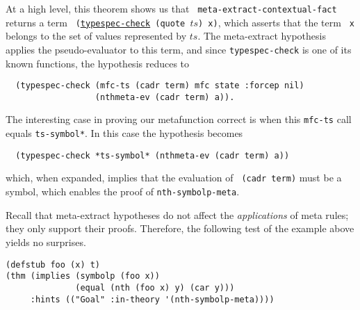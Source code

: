 \noindent At a high level, this theorem shows us that {\tt
  meta-extract-contextual-fact} returns a term {\tt
  (\href{http://www.cs.utexas.edu/users/moore/acl2/manuals/current/manual/index.html?topic=ACL2\_\_\_\_TYPESPEC-CHECK}{\underline{typespec-check}} (quote $ts$) x)}, which asserts that the term {\tt
  x} belongs to the set of values represented by $ts$.  The
meta-extract hypothesis applies the pseudo-evaluator to this term, and
since {\tt typespec-\allowbreak{}check} is one of its known functions, the
hypothesis reduces to
\begin{verbatim}
  (typespec-check (mfc-ts (cadr term) mfc state :forcep nil)
                  (nthmeta-ev (cadr term) a)).
\end{verbatim}
\noindent The interesting case in proving our metafunction correct is
when this {\tt mfc-ts} call equals {\tt *ts-symbol*}.  In this case the hypothesis becomes
\begin{verbatim}
  (typespec-check *ts-symbol* (nthmeta-ev (cadr term) a))
\end{verbatim}
\noindent which, when expanded, implies that the evaluation of {\tt
  (cadr term)} must be a
symbol, which enables the proof of {\tt nth-symbolp-meta}.



Recall that meta-extract hypotheses do not affect the {\em
  applications} of meta rules; they only support their proofs.
Therefore, the following test of the example above yields no surprises.

\begin{verbatim}
(defstub foo (x) t)
(thm (implies (symbolp (foo x))
              (equal (nth (foo x) y) (car y)))
     :hints (("Goal" :in-theory '(nth-symbolp-meta))))
\end{verbatim}


